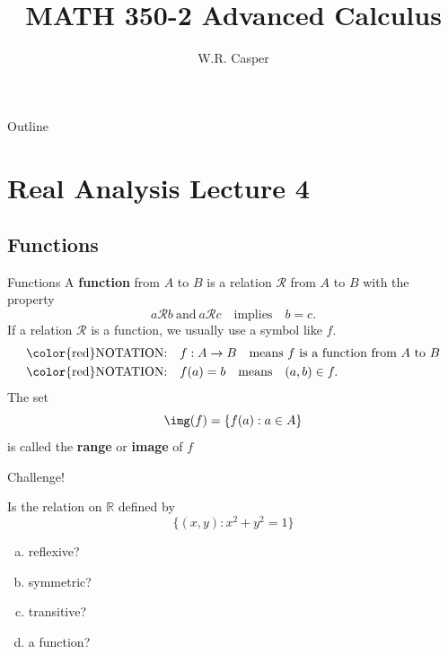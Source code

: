 \documentclass{beamer}
\title{MATH 350-2 Advanced Calculus}
\subtitle
{} %
\author[W.R. Casper] %
{W.R. Casper}
\institute[California State University Fullerton] %
{
  Department of Mathematics\\
  California State University Fullerton}
\begin{document}
\begin{frame}
  \titlepage
\end{frame}

\begin{frame}{Outline}
  \tableofcontents
\end{frame}



\section{Real Analysis Lecture 4}

\subsection{Functions}

\begin{frame}{Functions}
A \textbf{function} from $A$ to $B$ is a relation $\mathcal R$ from $A$ to $B$ with the property
\pause
$$a\mathcal Rb\ \text{and}\ a\mathcal Rc\quad\text{implies}\quad b=c.$$
\pause
If a relation $\mathcal R$ is a function, we usually use a symbol like $f$.\\
\pause
\begin{align*}
\text{\color{red}NOTATION:}&\quad f: A\rightarrow B\quad\text{means $f$ is a function from $A$ to $B$}\\
\text{\color{red}NOTATION:}&\quad f(a) = b\quad\text{means}\quad (a,b)\in f.
\end{align*}
\pause
The set $$\img(f) = \{f(a): a\in A\}$$ is called the \textbf{range} or \textbf{image} of $f$
\end{frame}

\begin{frame}{Challenge!}
\begin{prob}
Is the relation on $\mathbb{R}$ defined by
$$\{(x,y): x^2+y^2=1\}$$
\begin{enumerate}[(a)]
\pause
\item reflexive?
\pause
\item symmetric?
\pause
\item transitive?
\pause
\item a function?
\end{enumerate}
\end{prob}
\end{frame}
\end{document}
